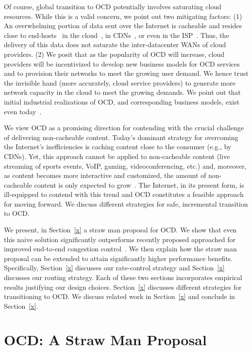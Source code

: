 \documentclass[sigconf,usenames,dvipsnames,geometry]{acmart}
\begin{document}
Of course, global transition to OCD potentially involves saturating cloud resources. While this is a valid concern, we point out two mitigating factors: (1) An overwhelming portion of data sent over the Internet is cacheable and resides close to end-hosts~\cite{x,y,z} in the cloud~\cite{x,y,z}, in CDNs~\cite{x,y,z}, or even in the ISP~\cite{x,y,z}. Thus, the delivery of this data does not saturate the inter-datacenter WANs of cloud providers. (2) We posit that as the popularity of OCD will increase, cloud providers will be incentivized to develop new business models for OCD services and to provision their networks to meet the growing user demand. We hence trust the invisible hand (more accurately, cloud service providers) to generate more network capacity in the cloud to meet the growing demands. We point out that initial industrial realizations of OCD, and corresponding business models, exist even today~\cite{VMware?,teridion}.

We view OCD as a promising direction for contending with the crucial challenge of delivering non-cacheable content. Today's dominant strategy for overcoming the Internet's inefficiencies is caching content close to the consumer (e.g., by CDNs). Yet, this approach cannot be applied to non-cacheable content (live streaming of sports events, VoIP, gaming, videoconferencing, etc.) and, moreover, as content becomes more interactive and customized, the amount of non-cacheable content is only expected to grow~\cite{x,y,z}. The Internet, in its present form, is ill-equipped to contend with this trend and OCD constitutes a feasible approach for moving forward. We discuss different strategies for safe, incremental transition to OCD.

\vspace{0.1in} We present, in Section~\ref{x} a straw man proposal for OCD. We show that even this naive solution significantly outperforms recently proposed approached for improved end-to-end congestion control~\cite{BBR, PCC}. We then explain how the straw man proposal can be extended to attain significantly higher performance benefits. Specifically, Section~\ref{x} discusses our rate-control strategy and Section~\ref{x} discusses our routing strategy. Each of these two sections incorporates empirical results justifying our design choices. Section~\ref{x} discusses different strategies for transitioning to OCD. We discuss related work in Section~\ref{x} and conclude in Section~\ref{x}.

\section{OCD: A Straw Man Proposal}\label{sec:straw_man}
\end{document}
